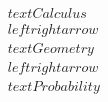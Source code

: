 \documentclass[preview]{standalone}
\begin{document}
\begin{align*}
\quad\\text{Calculus} \quad\\leftrightarrow \quad\\text{Geometry} \quad\\leftrightarrow \quad\\text{Probability}
\end{align*}
\end{document}

